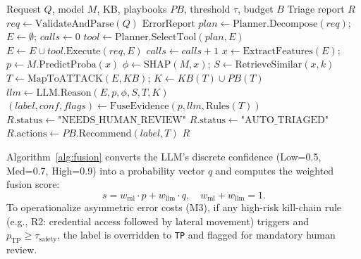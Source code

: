 \begin{algorithm}[t]
\caption{SOC Triage Agent}
\label{alg:triage}
\scriptsize
\begin{algorithmic}[1]
\REQUIRE Request $Q$, model $M$, KB, playbooks $PB$, threshold $\tau$, budget $B$
\ENSURE Triage report $R$
\STATE $req \leftarrow \text{ValidateAndParse}(Q)$
 \RETURN $\text{ErrorReport}$ \ENDIF
\STATE $plan \leftarrow \text{Planner.Decompose}(req)$; $E \leftarrow \emptyset$; $calls \leftarrow 0$
\REPEAT
    \STATE $tool \leftarrow \text{Planner.SelectTool}(plan, E)$
    \STATE $E \leftarrow E \cup tool.\text{Execute}(req, E)$
    \STATE $calls \leftarrow calls + 1$
\STATE $x \leftarrow \text{ExtractFeatures}(E)$; $p \leftarrow M.\text{PredictProba}(x)$
\STATE $\phi \leftarrow \text{SHAP}(M, x)$; $S \leftarrow \text{RetrieveSimilar}(x, k)$
\STATE $T \leftarrow \text{MapToATTACK}(E, KB)$; $K \leftarrow KB(T) \cup PB(T)$
\STATE $llm \leftarrow \text{LLM.Reason}(E, p, \phi, S, T, K)$
\STATE $(label, conf, flags) \leftarrow \text{FuseEvidence}(p, llm, \text{Rules}(T))$
    \STATE $R.\text{status} \leftarrow \text{"NEEDS\_HUMAN\_REVIEW"}$
\ELSE
    \STATE $R.\text{status} \leftarrow \text{"AUTO\_TRIAGED"}$
\ENDIF
\STATE $R.\text{actions} \leftarrow PB.\text{Recommend}(label, T)$
\RETURN $R$
\end{algorithmic}
\end{algorithm}

Algorithm~\ref{alg:fusion} converts the LLM's discrete confidence (Low=0.5, Med=0.7, High=0.9) into a probability vector $q$ and computes the weighted fusion score:
\begin{equation}
s = w_{\text{ml}} \cdot p + w_{\text{llm}} \cdot q, \quad w_{\text{ml}} + w_{\text{llm}} = 1.
\label{eq:fusion}
\end{equation}
To operationalize asymmetric error costs (M3), if any high-risk kill-chain rule (e.g., R2: credential access followed by lateral movement) triggers and $p_{\text{TP}} \ge \tau_{\text{safety}}$, the label is overridden to \texttt{TP} and flagged for mandatory human review.

